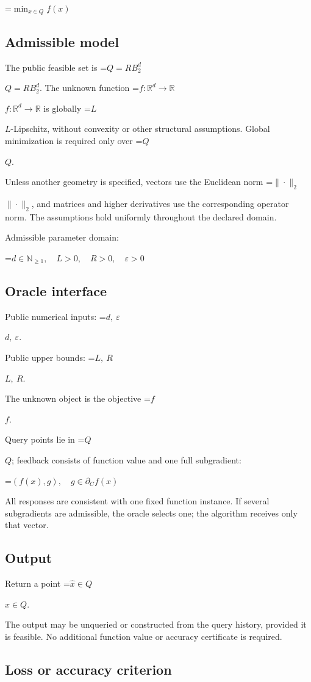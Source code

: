 \documentclass[10pt,a4paper]{article}
\newcommand{\AtlasMath}[1]{\par\begingroup\centering\setbox0=\hbox{$\displaystyle #1$}\ifdim\wd0>1.4\linewidth\typeout{ATLAS WIDE FORMULA: \the\wd0}\fi\ifdim\wd0>\linewidth\resizebox{\linewidth}{!}{\box0}\else\box0\fi\par\endgroup}
\newcommand{\AtlasInlineMath}[1]{\begingroup\setbox0=\hbox{$#1$}\ifdim\wd0>.4\linewidth\endgroup\AtlasMath{#1}\else\endgroup$#1$\fi}
\begin{document}
\AtlasMath{\min_{x\in Q}f(x)}


\subsection{Admissible model}
The public feasible set is \AtlasInlineMath{Q=RB_2^d}. The unknown function \AtlasInlineMath{f:\mathbb R^d\to\mathbb R} is globally \AtlasInlineMath{L}-Lipschitz, without convexity or other structural assumptions. Global minimization is required only over \AtlasInlineMath{Q}.

Unless another geometry is specified, vectors use the Euclidean norm \AtlasInlineMath{\|\cdot\|_2}, and matrices and higher derivatives use the corresponding operator norm. The assumptions hold uniformly throughout the declared domain.

Admissible parameter domain:


\AtlasMath{d\in\mathbb{N}_{\ge1},\quad L>0,\quad R>0,\quad \varepsilon>0}


\subsection{Oracle interface}
Public numerical inputs: \AtlasInlineMath{d,\ \varepsilon}.

Public upper bounds: \AtlasInlineMath{L,\ R}.

The unknown object is the objective \AtlasInlineMath{f}.

Query points lie in \AtlasInlineMath{Q}; feedback consists of function value and one full subgradient:


\AtlasMath{(f(x),g),\quad g\in\partial_C f(x)}


All responses are consistent with one fixed function instance. If several subgradients are admissible, the oracle selects one; the algorithm receives only that vector.

\subsection{Output}
Return a point \AtlasInlineMath{\widehat x\in Q}.

The output may be unqueried or constructed from the query history, provided it is feasible. No additional function value or accuracy certificate is required.

\subsection{Loss or accuracy criterion}
\end{document}
